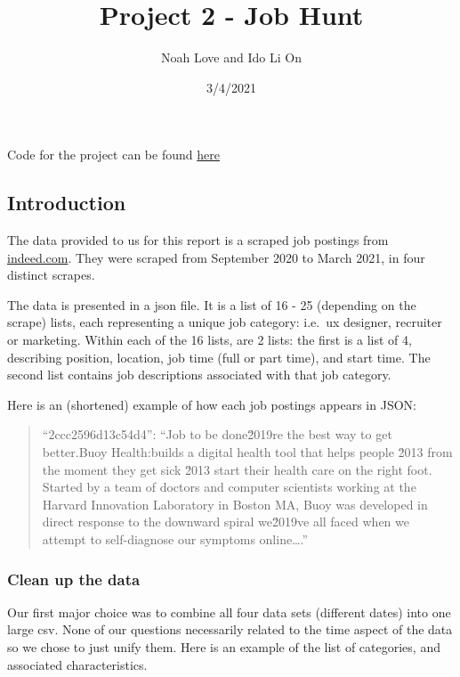 \documentclass[
]{article}
\title{Project 2 - Job Hunt}
\author{Noah Love and Ido Li On}
\date{3/4/2021}
\begin{document}
\maketitle

Code for the project can be found
\href{\%22https://github.com/noahlove/data-mining-project-2.git\%22}{here}

\hypertarget{introduction}{%
\subsection{Introduction}\label{introduction}}

The data provided to us for this report is a scraped job postings from
\href{https://www.indeed.com/}{indeed.com}. They were scraped from
September 2020 to March 2021, in four distinct scrapes.

The data is presented in a json file. It is a list of 16 - 25 (depending
on the scrape) lists, each representing a unique job category: i.e.~ux
designer, recruiter or marketing. Within each of the 16 lists, are 2
lists: the first is a list of 4, describing position, location, job time
(full or part time), and start time. The second list contains job
descriptions associated with that job category.

Here is an (shortened) example of how each job postings appears in JSON:

\begin{quote}
``2ccc2596d13c54d4'': ``Job to be done\nWe\u2019re the best way to get
better.\n\nAbout Buoy Health:\nBuoy builds a digital health tool that
helps people \u2013 from the moment they get sick \u2013 start their
health care on the right foot. Started by a team of doctors and computer
scientists working at the Harvard Innovation Laboratory in Boston MA,
Buoy was developed in direct response to the downward spiral we\u2019ve
all faced when we attempt to self-diagnose our symptoms online\ldots.''
\end{quote}

\hypertarget{clean-up-the-data}{%
\subsubsection{Clean up the data}\label{clean-up-the-data}}

Our first major choice was to combine all four data sets (different
dates) into one large csv. None of our questions necessarily related to
the time aspect of the data so we chose to just unify them. Here is an
example of the list of categories, and associated characteristics.
\end{document}
